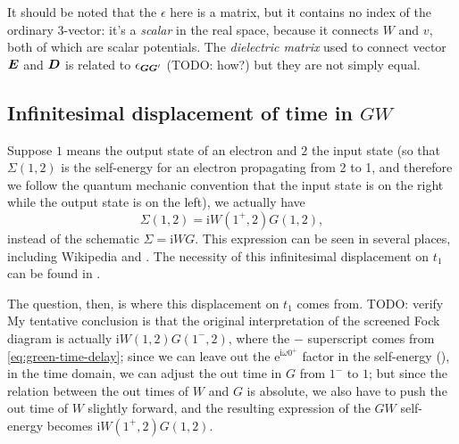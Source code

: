 \documentclass[hyperref, a4paper]{report}
\newcommand*{\ii}{\mathrm{i}}
\newcommand*{\ee}{\mathrm{e}}
\begin{document}
It should be noted that the $\epsilon$ here is a matrix,
but it contains no index of the ordinary 3-vector:
it's a \emph{scalar} in the real space,
because it connects $W$ and $v$,
both of which are scalar potentials.
The \emph{dielectric matrix} used to connect vector $\vb*{E}$ and $\vb*{D}$
is related to $\epsilon_{\vb*{G} \vb*{G}'}$ (TODO: how?)
but they are not simply equal. 

\subsection{Infinitesimal displacement of time in $GW$}\label{sec:gw-bse.overview-gw.infinitesimal}

Suppose $1$ means the output state of an electron 
and $2$ the input state
(so that $\Sigma(1, 2)$ is the self-energy for an electron propagating from 2 to 1,
and therefore we follow the quantum mechanic convention that 
the input state is on the right while the output state is on the left), 
we actually have 
\begin{equation}
    \Sigma(1, 2) = \ii W(1^+, 2) G(1, 2),
\end{equation}
instead of the schematic $\Sigma = \ii W G$.
This expression can be seen in several places,
including Wikipedia and \cite{hedin1965new,berger2020potential}.
The necessity of this infinitesimal displacement on $t_1$
can be found in .

The question, then, is where this displacement on $t_1$ comes from. TODO: verify 
My tentative conclusion is that the original interpretation of the screened Fock diagram 
is actually $\ii W(1, 2) G(1^-, 2)$, 
where the $-$ superscript comes from \eqref{eq:green-time-delay};
since we can leave out the $\ee^{\ii \omega 0^+}$ factor in the self-energy 
(),
in the time domain,
we can adjust the out time in $G$ from $1^-$ to $1$;
but since the relation between the out times of $W$ and $G$ is absolute, 
we also have to push the out time of $W$ slightly forward, 
and the resulting expression of the $GW$ self-energy becomes 
$\ii W(1^+, 2) G(1, 2)$.
\end{document}
